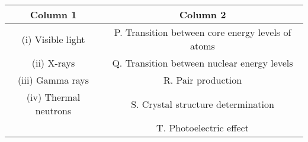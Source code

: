 \begin{center}
\begin{tabular}{|c|c|}
\hline
\textbf{Column 1} & \textbf{Column 2} \\
\hline
(i) Visible light & P. Transition between core energy levels of atoms \\
\hline
(ii) X-rays & Q. Transition between nuclear energy levels \\
\hline
(iii) Gamma rays & R. Pair production \\
\hline
(iv) Thermal neutrons & S. Crystal structure determination \\
\hline
 & T. Photoelectric effect \\
\hline
\end{tabular}
\end{center}
